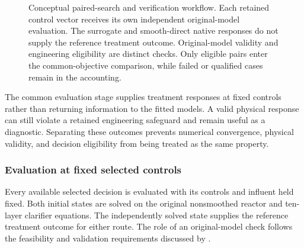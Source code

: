 \begin{figure}[htbp]
\caption{Conceptual paired-search and verification workflow. Each retained control vector receives its own independent original-model evaluation. The surrogate and smooth-direct native responses do not supply the reference treatment outcome. Original-model validity and engineering eligibility are distinct checks. Only eligible pairs enter the common-objective comparison, while failed or qualified cases remain in the accounting.}
\label{fig:plant_route_verification}
\end{figure}

The common evaluation stage supplies treatment responses at fixed controls rather than returning information to the fitted models. A valid physical response can still violate a retained engineering safeguard and remain useful as a diagnostic. Separating these outcomes prevents numerical convergence, physical validity, and decision eligibility from being treated as the same property.

\subsubsection{Evaluation at fixed selected controls}

Every available selected decision is evaluated with its controls and influent held fixed. Both initial states are solved on the original nonsmoothed reactor and ten-layer clarifier equations. The independently solved state supplies the reference treatment outcome for either route. The role of an original-model check follows the feasibility and validation requirements discussed by \citet{BhosekarIerapetritou2018}.


